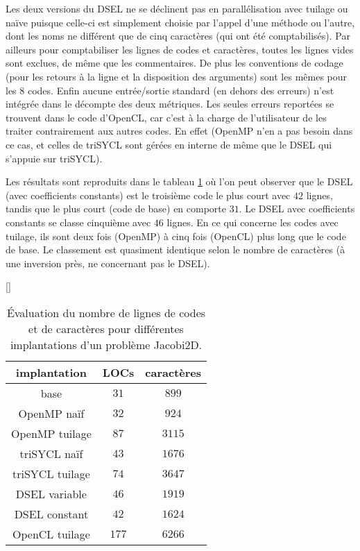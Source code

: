 Les deux versions du DSEL ne se déclinent pas en parallélisation avec tuilage ou naïve puisque celle-ci est simplement choisie par l'appel d'une méthode ou l'autre, dont les noms ne différent que de cinq caractères (qui ont été comptabilisés). Par ailleurs pour comptabiliser les lignes de codes et caractères, toutes les lignes vides sont exclues, de même que les commentaires. De plus les conventions de codage (pour les retours à la ligne et la disposition des arguments) sont les mêmes pour les $8$ codes. Enfin aucune entrée/sortie standard (en dehors des erreurs) n'est intégrée dans le décompte des deux métriques. Les seules erreurs reportées se trouvent dans le code d'\textsf{OpenCL}, car c'est à la charge de l'utilisateur de les traiter contrairement aux autres codes. En effet (\textsf{OpenMP} n'en a pas besoin dans ce cas, et celles de \textsf{triSYCL} sont gérées en interne de même que le DSEL qui s'appuie sur \textsf{triSYCL}).

Les résultats sont reproduits dans le tableau \ref{tab:eval_qual} où l'on peut observer que le DSEL (avec coefficients constants) est le troisième code le plus court avec $42$ lignes, tandis que le plus court (code de base) en comporte $31$. Le DSEL avec coefficients constants se classe cinquième avec $46$ lignes. En ce qui concerne les codes avec tuilage, ils sont deux fois (\textsf{OpenMP}) à cinq fois (\textsf{OpenCL}) plus long que le code de base. Le classement est quasiment identique selon le nombre de caractères (à une inversion près, ne concernant pas le DSEL).

\begin{table}
[\FBwidth]
{
\caption{Évaluation du nombre de lignes de codes et de caractères pour différentes implantations d'un problème Jacobi2D.}
\label{tab:eval_qual}
}
{
\begin{tabular}{||c||c|c||}
\hline
implantation & LOCs & caractères \\
\hline
\hline
base & $31$ & $899$ \\
\hline
OpenMP naïf & $32$ & $924$ \\
\hline
OpenMP tuilage & $87$ & $3115$ \\
\hline
triSYCL naïf & $43$ & $1676$ \\
\hline
triSYCL tuilage & $74$ & $3647$ \\
\hline
DSEL variable & $46$ & $1919$ \\
\hline
DSEL constant & $42$ & $1624$ \\
\hline
OpenCL tuilage & $177$ & $6266$ \\
\hline
\end{tabular}
}
\end{table}

